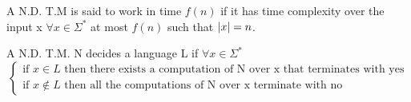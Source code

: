 \begin{definition}
    A N.D. T.M is said to work in time $f(n)$ if it has time complexity over the input x $\forall x \in \Sigma^*$ at most $f(n)$ such that $\left\lvert x\right\rvert=n$.
\end{definition}
\begin{definition}
    A N.D. T.M. N decides a language L if $\forall x \in \Sigma^*$
    \[ 
        \begin{cases}
            \text{if } x\in L \text{ then there exists a computation of N over x that terminates with yes} \\
            \text{if } x\notin L \text{ then all the computations of N over x terminate with no} 
        \end{cases}
    \]
\end{definition}


